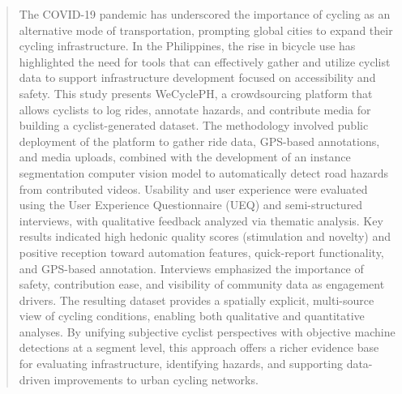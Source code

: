 \begin{abstract}
The COVID-19 pandemic has underscored the importance of cycling as an alternative mode of transportation, prompting global cities to expand their cycling infrastructure. In the Philippines, the rise in bicycle use has highlighted the need for tools that can effectively gather and utilize cyclist data to support infrastructure development focused on accessibility and safety. This study presents WeCyclePH, a crowdsourcing platform that allows cyclists to log rides, annotate hazards, and contribute media for building a cyclist-generated dataset. The methodology involved public deployment of the platform to gather ride data, GPS-based annotations, and media uploads, combined with the development of an instance segmentation computer vision model to automatically detect road hazards from contributed videos. Usability and user experience were evaluated using the User Experience Questionnaire (UEQ) and semi-structured interviews, with qualitative feedback analyzed via thematic analysis. Key results indicated high hedonic quality scores (stimulation and novelty) and positive reception toward automation features, quick-report functionality, and GPS-based annotation. Interviews emphasized the importance of safety, contribution ease, and visibility of community data as engagement drivers. The resulting dataset provides a spatially explicit, multi-source view of cycling conditions, enabling both qualitative and quantitative analyses. By unifying subjective cyclist perspectives with objective machine detections at a segment level, this approach offers a richer evidence base for evaluating infrastructure, identifying hazards, and supporting data-driven improvements to urban cycling networks.



\end{abstract}
